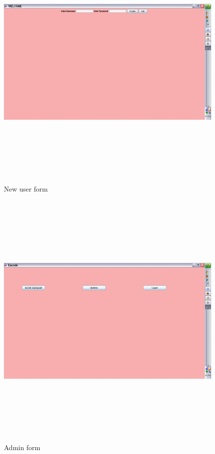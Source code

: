 \begin{center}
\begin{figure}[H]
\includegraphics[width=16cm,height=13cm]{newuser.eps}
\caption{New user form}
\end{figure}

\begin{figure}[H]
\includegraphics[width=16cm,height=13cm]{admin.eps}
\caption{Admin form}
\end{figure}


\end{center}
